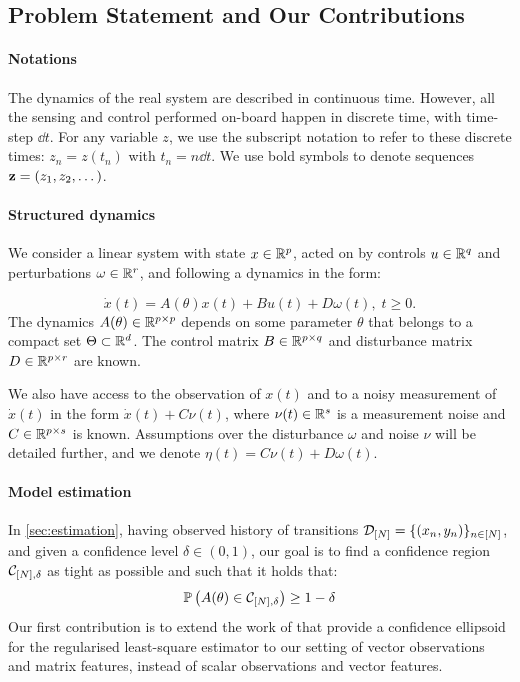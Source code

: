 \documentclass{article}
\begin{document}
\subsection{Problem Statement and Our Contributions}

\paragraph{Notations}

The dynamics of the real system are described in continuous time. However, all the sensing and control performed on-board happen in discrete time, with time-step $\dd t$. For any variable $z$, we use the subscript notation to refer to these discrete times: $z_n = z(t_n)$ with $t_n = n\dd t$. We use bold symbols to denote sequences $\mathbf{z} = (z_1,z_2,\dots)$.

\paragraph{Structured dynamics}
We consider a linear system with state $x\in\mathbb{R}^p$, acted on by controls $u\in\mathbb{R}^q$ and perturbations $\omega\in\mathbb{R}^r$, and following a dynamics in the form:

\begin{equation}
\label{eq:dynamics}
\dot{x}(t)=A(\theta)x(t) + B u(t) + D \omega(t),\;t\geq0.
\end{equation}
The dynamics $A(\theta)\in\mathbb{R}^{p\times p}$  depends on some parameter $\theta$ that belongs to a compact set $\Theta \subset \mathbb{R}^d$. The control matrix $B\in\mathbb{R}^{p\times q}$ and disturbance matrix $D\in\mathbb{R}^{p\times r}$ are known.

We also have access to the observation of $x(t)$ and to a noisy measurement of $\dot{x}(t)$ in the form $\dot{x}(t) + C\nu(t)$, where $\nu(t)\in\mathbb{R}^s$ is a measurement noise and $C\in\mathbb{R}^{p\times s}$ is known. Assumptions over the disturbance $\omega$ and noise $\nu$ will be detailed further, and we denote $\eta(t) = C\nu(t) + D\omega(t)$.

\paragraph{Model estimation}

In \autoref{sec:estimation}, having observed history of transitions $\mathcal{D}_{[N]} = \{(x_n, y_n)\}_{n\in[N]}$, and given a confidence level $\delta\in(0, 1)$, our goal is to find a confidence region $\mathcal{C}_{[N],\delta}$ as tight as possible and such that it holds that:
\begin{align}
\mathbb{P}\left(A(\theta)\in \mathcal{C}_{[N],\delta}\right) \geq 1-\delta
\label{eq:confidence}
\end{align}
Our first contribution is to extend the work of \citet{Abbasi2011} that provide a confidence ellipsoid for the regularised least-square estimator to our setting of vector observations and matrix features, instead of scalar observations and vector features.
\end{document}
